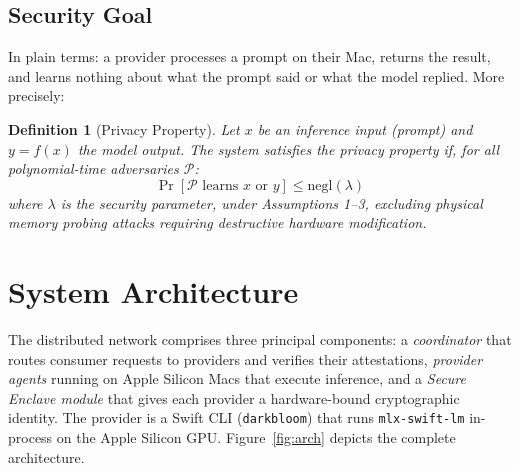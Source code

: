 \documentclass[10pt,twocolumn,letterpaper]{article}
\newtheorem{definition}{Definition}
\begin{document}
\subsection{Security Goal}

In plain terms: a provider processes a prompt on their Mac, returns the result, and learns nothing about what the prompt said or what the model replied. More precisely:

\begin{definition}[Privacy Property]
\label{def:privacy}
Let $x$ be an inference input (prompt) and $y = f(x)$ the model output. The system satisfies the \emph{privacy property} if, for all polynomial-time adversaries $\mathcal{P}$:
\begin{equation}
\Pr[\mathcal{P} \text{ learns } x \text{ or } y] \leq \text{negl}(\lambda)
\end{equation}
where $\lambda$ is the security parameter, under Assumptions 1--3, excluding physical memory probing attacks requiring destructive hardware modification.
\end{definition}

\section{System Architecture}
\label{sec:arch}

The distributed network comprises three principal components: a \emph{coordinator} that routes consumer requests to providers and verifies their attestations, \emph{provider agents} running on Apple Silicon Macs that execute inference, and a \emph{Secure Enclave module} that gives each provider a hardware-bound cryptographic identity. The provider is a Swift CLI (\texttt{darkbloom}) that runs \texttt{mlx-swift-lm} in-process on the Apple Silicon GPU. Figure~\ref{fig:arch} depicts the complete architecture.
\end{document}
